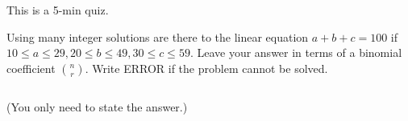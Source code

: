 

\renewcommand\AUTHOR{nweadick1@cougars.ccis.edu} %


\topmattertwo

This is a 5-min quiz.

\nextq
Using many integer solutions are there to the linear equation
$a + b + c = 100$ if $10 \leq a \leq 29, 20 \leq b \leq 49, 30 \leq c \leq 59$.
Leave your answer in terms of a binomial coefficient $\binom{n}{r}$.
Write ERROR if the problem cannot be solved.
\\
\ANSWER
\begin{answerlong}
$ $
\end{answerlong}
(You only need to state the answer.)

\newpage


